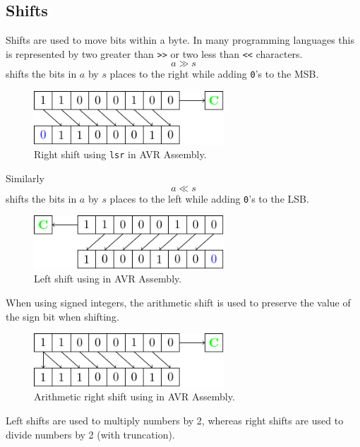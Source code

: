 \documentclass{report}
\newcommand{\keyword}[1]{\textcolor[rgb]{0.00,0.50,0.00}{\textbf{#1}}}
\begin{document}
\subsection{Shifts}
Shifts are used to move bits within a byte. In many programming languages this is represented by two greater than \texttt{>>} or two less than \texttt{<<} characters.
\begin{equation*}
    a \gg s
\end{equation*}
shifts the bits in \(a\) by \(s\) places to the right while adding \texttt{0}'s to the MSB.\
\begin{figure}[H]
    \centering
    \includegraphics[height = 2cm, keepaspectratio = true]{figures/logical_right_shift.pdf}
    \caption{Right shift using \texttt{lsr} in AVR Assembly.} %
\end{figure}
Similarly
\begin{equation*}
    a \ll s
\end{equation*}
shifts the bits in \(a\) by \(s\) places to the left while adding \texttt{0}'s to the LSB.\
\begin{figure}[H]
    \centering
    \includegraphics[height = 2cm, keepaspectratio = true]{figures/logical_left_shift.pdf}
    \caption{Left shift using \keyword{} in AVR Assembly.} %
\end{figure}
When using signed integers, the arithmetic shift is used to preserve the value of the sign bit when shifting.
\begin{figure}[H]
    \centering
    \includegraphics[height = 2cm, keepaspectratio = true]{figures/arithmetic_right_shift.pdf}
    \caption{Arithmetic right shift using \keyword{} in AVR Assembly.} %
\end{figure}
Left shifts are used to multiply numbers by 2, whereas right shifts are used to divide numbers by 2 (with truncation).
\end{document}
